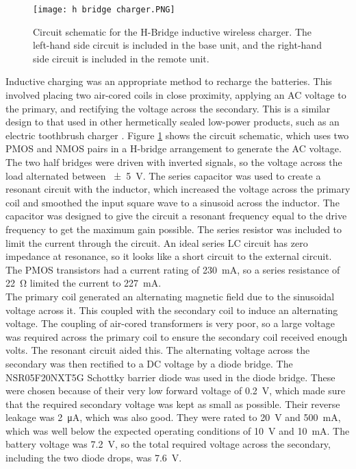 \begin{figure}[htb]
	\centering
	\texttt{[image: h bridge charger.PNG]}
	\caption{Circuit schematic for the H-Bridge inductive wireless charger. The left-hand side circuit is included in the base unit, and the right-hand side circuit is included in the remote unit.}
	\label{fig: charger schematic}
\end{figure}
	

Inductive charging was an appropriate method to recharge the batteries. This involved placing two air-cored coils in close proximity, applying an AC voltage to the primary, and rectifying the voltage across the secondary. This is a similar design to that used in other hermetically sealed low-power products, such as an electric toothbrush charger \cite{wireless_power_review}. Figure \ref{fig: charger schematic} shows the circuit schematic, which uses two PMOS and NMOS pairs in a H-bridge arrangement to generate the AC voltage. The two half bridges were driven with inverted signals, so the voltage across the load alternated between \SI{\pm 5}{\volt}. The series capacitor was used to create a resonant circuit with the inductor, which increased the voltage across the primary coil and smoothed the input square wave to a sinusoid across the inductor. The capacitor was designed to give the circuit a resonant frequency equal to the drive frequency to get the maximum gain possible. The series resistor was included to limit the current through the circuit. An ideal series LC circuit has zero impedance at resonance, so it looks like a short circuit to the external circuit. The PMOS transistors had a current rating of \SI{230}{\milli\ampere}, so a series resistance of \SI{22}{\ohm} limited the current to \SI{227}{\milli\ampere}.\\

The primary coil generated an alternating magnetic field due to the sinusoidal voltage across it. This coupled with the secondary coil to induce an alternating voltage. The coupling of air-cored transformers is very poor, so a large voltage was required across the primary coil to ensure the secondary coil received enough volts. The resonant circuit aided this. The alternating voltage across the secondary was then rectified to a DC voltage by a diode bridge. The NSR05F20NXT5G Schottky barrier diode \cite{original_diode} was used in the diode bridge. These were chosen because of their very low forward voltage of \SI{0.2}{\volt}, which made sure that the required secondary voltage was kept as small as possible. Their reverse leakage was \SI{2}{\micro\ampere}, which was also good. They were rated to \SI{20}{\volt} and \SI{500}{\milli\ampere}, which was well below the expected operating conditions of \SI{10}{\volt} and \SI{10}{\milli\ampere}. The battery voltage was \SI{7.2}{\volt}, so the total required voltage across the secondary, including the two diode drops, was \SI{7.6}{\volt}.\\

